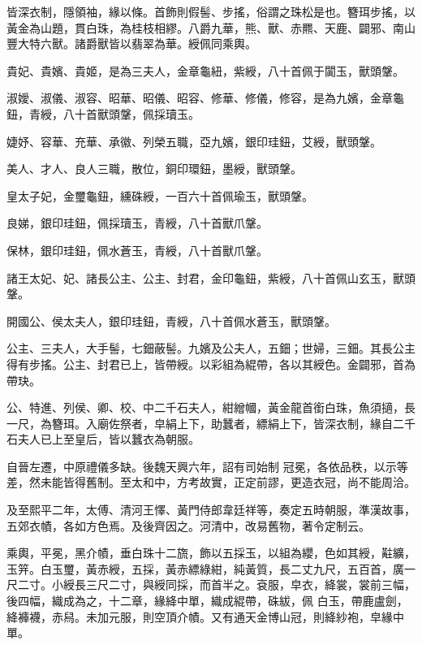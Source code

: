 \begin{pinyinscope}
 皆深衣制，隱領袖，緣以條。首飾則假髻、步搖，俗謂之珠松是也。簪珥步搖，以黃金為山題，貫白珠，為桂枝相繆。八爵九華，熊、獸、赤羆、天鹿、闢邪、南山豐大特六獸。諸爵獸皆以翡翠為華。綬佩同乘輿。



 貴妃、貴嬪、貴姬，是為三夫人，金章龜紐，紫綬，八十首佩于闐玉，獸頭鞶。



 淑嬡、淑儀、淑容、昭華、昭儀、昭容、修華、修儀，修容，是為九嬪，金章龜鈕，青綬，八十首獸頭鞶，佩採瓄玉。



 婕妤、容華、充華、承徽、列榮五職，亞九嬪，銀印珪鈕，艾綬，獸頭鞶。



 美人、才人、良人三職，散位，銅印環鈕，墨綬，獸頭鞶。



 皇太子妃，金璽龜鈕，纁硃綬，一百六十首佩瑜玉，獸頭鞶。



 良娣，銀印珪鈕，佩採瓄玉，青綬，八十首獸爪鞶。



 保林，銀印珪鈕，佩水蒼玉，青綬，八十首獸爪鞶。



 諸王太妃、妃、諸長公主、公主、封君，金印龜鈕，紫綬，八十首佩山玄玉，獸頭鞶。



 開國公、侯太夫人，銀印珪鈕，青綬，八十首佩水蒼玉，獸頭鞶。



 公主、三夫人，大手髻，七鈿蔽髻。九嬪及公夫人，五鈿；世婦，三鈿。其長公主得有步搖。公主、封君已上，皆帶綬。以彩組為緄帶，各以其綬色。金闢邪，首為帶玦。



 公、特進、列侯、卿、校、中二千石夫人，紺繒幗，黃金龍首銜白珠，魚須擿，長一尺，為簪珥。入廟佐祭者，皁絹上下，助蠶者，縹絹上下，皆深衣制，緣自二千石夫人已上至皇后，皆以蠶衣為朝服。



 自晉左遷，中原禮儀多缺。後魏天興六年，詔有司始制
 冠冕，各依品秩，以示等差，然未能皆得舊制。至太和中，方考故實，正定前謬，更造衣冠，尚不能周洽。



 及至熙平二年，太傅、清河王懌、黃門侍郎韋廷祥等，奏定五時朝服，準漢故事，五郊衣幘，各如方色焉。及後齊因之。河清中，改易舊物，著令定制云。



 乘輿，平冕，黑介幘，垂白珠十二旒，飾以五採玉，以組為纓，色如其綬，黈纊，玉笄。白玉璽，黃赤綬，五採，黃赤縹綠紺，純黃質，長二丈九尺，五百首，廣一尺二寸。小綬長三尺二寸，與綬同採，而首半之。袞服，皁衣，絳裳，裳前三幅，後四幅，織成為之，十二章，緣絳中單，織成緄帶，硃紱，佩
 白玉，帶鹿盧劍，絳褲襪，赤舄。未加元服，則空頂介幘。又有通天金博山冠，則絳紗袍，皁緣中單。




\end{pinyinscope}
